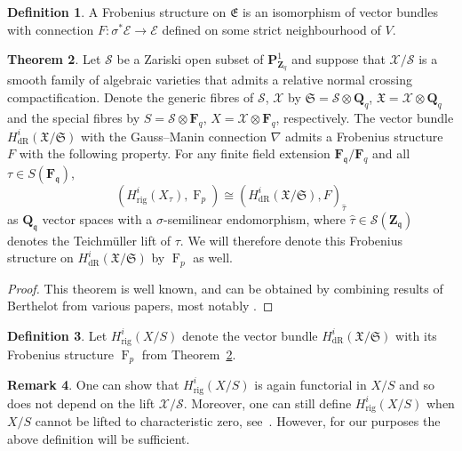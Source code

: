 \documentclass[a4paper,11pt]{article}
\numberwithin{equation}{section}
\newcommand{\ZZ}{\mathbf{Z}} %
\newcommand{\QQ}{\mathbf{Q}} %
\newcommand{\FF}{\mathbf{F}} %
\DeclareMathOperator{\Frob}{F}           %
\providecommand{\HdR}{H_{\text{dR}}}    %
\providecommand{\Hrig}{H_{\text{rig}}}  %
\theoremstyle{definition}
\newtheorem{thm}{Theorem}[section]
\newtheorem{defn}[thm]{Definition}
\newtheorem{rem}[thm]{Remark}
\begin{document}
\begin{defn}
A Frobenius structure on $\mathfrak{E}$ is an isomorphism of vector bundles 
with connection $F \colon \sigma^* \mathcal{E} \rightarrow \mathcal{E}$ 
defined on some strict neighbourhood of $V$. 
\end{defn}

\begin{thm} \label{thm:frobstruc}
Let $\mathcal{S}$ be a Zariski open subset of $\mathbf{P}^1_{\ZZ_q}$ and 
suppose that $\mathcal{X}/\mathcal{S}$ is a smooth family of algebraic 
varieties that admits a relative normal crossing compactification. Denote 
the generic fibres of $\mathcal{S}$, $\mathcal{X}$ by 
$\mathfrak{S}=\mathcal{S} \otimes \QQ_q$, $\mathfrak{X}=\mathcal{X} \otimes \QQ_q$ 
and the special fibres by $S=\mathcal{S} \otimes \FF_q$, 
$X=\mathcal{X} \otimes \FF_q$, respectively. The vector bundle 
$\HdR^i(\mathfrak{X}/\mathfrak{S})$ with the Gauss--Manin connection $\nabla$ 
admits a Frobenius structure $F$ with the following property. 
For any finite field extension $\FF_{\mathfrak{q}}/\FF_q$ and
all $\tau \in S(\FF_{\mathfrak{q}})$,
\[
(\Hrig^i(X_{\tau}),\Frob_p) \cong (\HdR^i(\mathfrak{X}/\mathfrak{S}),F)_{\hat{\tau}}
\] 
as $\QQ_{\mathfrak{q}}$ vector spaces with a $\sigma$-semilinear 
endomorphism, where $\hat{\tau} \in \mathcal{S}(\ZZ_{\mathfrak{q}})$ denotes 
the Teichm\"uller lift of $\tau$. We will therefore denote this Frobenius 
structure on $\HdR^i(\mathfrak{X}/\mathfrak{S})$ by $\Frob_p$ as well.
\end{thm}

\begin{proof}
This theorem is well known, and can be obtained by combining results of 
Berthelot from various papers, most notably \citep{Berthelot1986}.   
\end{proof}

\begin{defn}
Let $\Hrig^i(X/S)$ denote the vector bundle $\HdR^i(\mathfrak{X}/\mathfrak{S})$ 
with its Frobenius structure $\Frob_p$ from Theorem~\ref{thm:frobstruc}.
\end{defn}

\begin{rem}
One can show that $\Hrig^i(X/S)$ is again functorial in $X/S$ and so does 
not depend on the lift $\mathcal{X}/\mathcal{S}$. Moreover, one can still 
define $\Hrig^i(X/S)$ when $X/S$ cannot be lifted to characteristic zero, 
see~\citep{Berthelot1986}.  However, for our purposes the above definition 
will be sufficient.
\end{rem}
\end{document}
